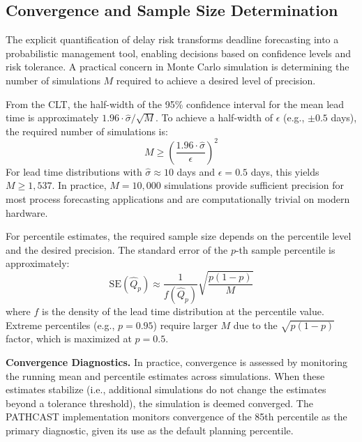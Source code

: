 \subsection{Convergence and Sample Size Determination}
\label{sec:mc-convergence}
The explicit quantification of delay risk transforms deadline forecasting into a probabilistic management tool, enabling decisions based on confidence levels and risk tolerance.
A practical concern in Monte Carlo simulation is determining the number
of simulations $M$ required to achieve a desired level of precision.

From the CLT, the half-width of the 95\% confidence interval for the
mean lead time is approximately $1.96 \cdot \hat{\sigma} / \sqrt{M}$.
To achieve a half-width of $\epsilon$ (e.g., $\pm 0.5$ days), the
required number of simulations is:
\begin{equation}
\label{eq:mc-sample-size}
M \geq \left( \frac{1.96 \cdot \hat{\sigma}}{\epsilon} \right)^2
\end{equation}
For lead time distributions with $\hat{\sigma} \approx 10$ days and
$\epsilon = 0.5$ days, this yields $M \geq 1{,}537$. In practice,
$M = 10{,}000$ simulations provide sufficient precision for most
process forecasting applications and are computationally trivial on
modern hardware.

For percentile estimates, the required sample size depends on the
percentile level and the desired precision. The standard error of the
$p$-th sample percentile is approximately:
\begin{equation}
\label{eq:percentile-se}
\text{SE}(\hat{Q}_p) \approx \frac{1}{f(\hat{Q}_p)}
\sqrt{\frac{p(1-p)}{M}}
\end{equation}
where $f$ is the density of the lead time distribution at the percentile
value. Extreme percentiles (e.g., $p = 0.95$) require larger $M$ due to
the $\sqrt{p(1-p)}$ factor, which is maximized at $p = 0.5$.

\textbf{Convergence Diagnostics.} In practice, convergence is assessed by
monitoring the running mean and percentile estimates across simulations.
When these estimates stabilize (i.e., additional simulations do not change
the estimates beyond a tolerance threshold), the simulation is deemed
converged. The PATHCAST implementation monitors convergence of the
85th percentile as the primary diagnostic, given its use as the default
planning percentile.


